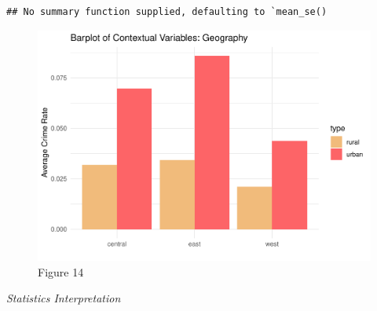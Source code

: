 \documentclass[]{article}
\begin{document}
\begin{verbatim}
## No summary function supplied, defaulting to `mean_se()
\end{verbatim}

\begin{figure}

{\centering \includegraphics{lab_3_v7_files/figure-latex/unnamed-chunk-42-1} 

}

\caption{Figure 14}\label{fig:unnamed-chunk-42}
\end{figure}

\emph{Statistics Interpretation}
\end{document}
